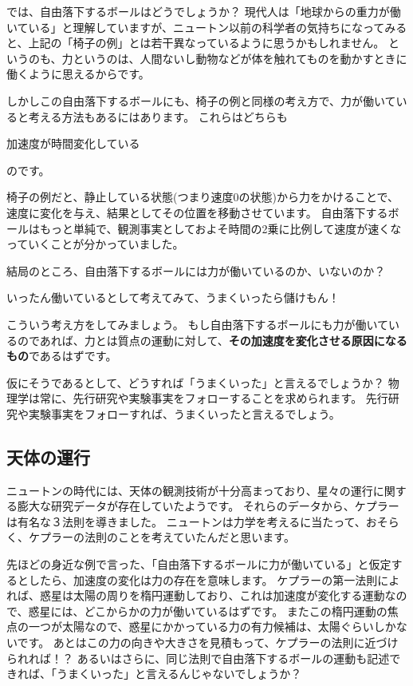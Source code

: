 では、自由落下するボールはどうでしょうか？
現代人は「地球からの重力が働いている」と理解していますが、ニュートン以前の科学者の気持ちになってみると、上記の「椅子の例」とは若干異なっているように思うかもしれません。
というのも、力というのは、人間ないし動物などが体を触れてものを動かすときに働くように思えるからです。

しかしこの自由落下するボールにも、椅子の例と同様の考え方で、力が働いていると考える方法もあるにはあります。
これらはどちらも
\begin{center}
  加速度が時間変化している
\end{center}
のです。

椅子の例だと、静止している状態(つまり速度0の状態)から力をかけることで、速度に変化を与え、結果としてその位置を移動させています。
自由落下するボールはもっと単純で、観測事実としておよそ時間の2乗に比例して速度が速くなっていくことが分かっていました。

結局のところ、自由落下するボールには力が働いているのか、いないのか？
\begin{center}
  いったん働いているとして考えてみて、うまくいったら儲けもん！
\end{center}
こういう考え方をしてみましょう。
もし自由落下するボールにも力が働いているのであれば、力とは質点の運動に対して、\textbf{その加速度を変化させる原因になるもの}であるはずです。

仮にそうであるとして、どうすれば「うまくいった」と言えるでしょうか？
物理学は常に、先行研究や実験事実をフォローすることを求められます。
先行研究や実験事実をフォローすれば、うまくいったと言えるでしょう。

\subsection{天体の運行}

ニュートンの時代には、天体の観測技術が十分高まっており、星々の運行に関する膨大な研究データが存在していたようです。
それらのデータから、ケプラーは有名な３法則を導きました。
ニュートンは力学を考えるに当たって、おそらく、ケプラーの法則のことを考えていたんだと思います。

先ほどの身近な例で言った、「自由落下するボールに力が働いている」と仮定するとしたら、加速度の変化は力の存在を意味します。
ケプラーの第一法則によれば、惑星は太陽の周りを楕円運動しており、これは加速度が変化する運動なので、惑星には、どこからかの力が働いているはずです。
またこの楕円運動の焦点の一つが太陽なので、惑星にかかっている力の有力候補は、太陽ぐらいしかないです。
あとはこの力の向きや大きさを見積もって、ケプラーの法則に近づけられれば！？
あるいはさらに、同じ法則で自由落下するボールの運動も記述できれば、「うまくいった」と言えるんじゃないでしょうか？

